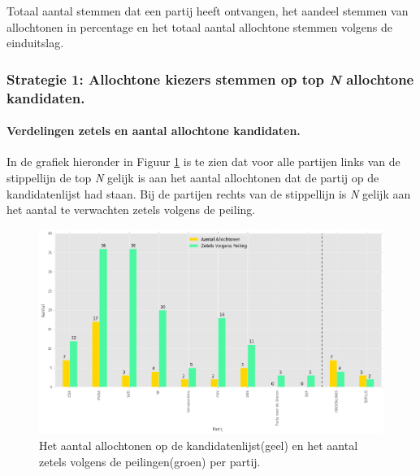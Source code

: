 \begin{table}[h]
\centering
	\begin{footnotesize}
		
	\end{footnotesize}
			\caption{Totaal aantal stemmen dat een partij heeft ontvangen, het aandeel stemmen van allochtonen in percentage en het totaal aantal allochtone stemmen volgens de einduitslag.}
\label{table:tab2A} 
\end{table}
    

\subsubsection{Strategie 1: Allochtone kiezers stemmen op top \textit{N} allochtone kandidaten.} \label{S1A}



\paragraph{Verdelingen zetels en aantal allochtone kandidaten.}
In de grafiek hieronder in Figuur \ref{fig:zetelsA} is te zien dat voor alle partijen links van de stippellijn de top \textit{N} gelijk is aan het aantal allochtonen dat de partij op de kandidatenlijst had staan. Bij de partijen rechts van de stippellijn is \textit{N} gelijk aan het aantal te verwachten zetels volgens de peiling. 
 
\begin{figure}[H]

	\includegraphics[width=\linewidth]	{Aantal_allochtonen_aantal_zetels1.png}

			\caption{Het aantal allochtonen op de kandidatenlijst(geel) en het aantal zetels volgens de peilingen(groen) per partij.}

\label{fig:zetelsA}
\end{figure}



